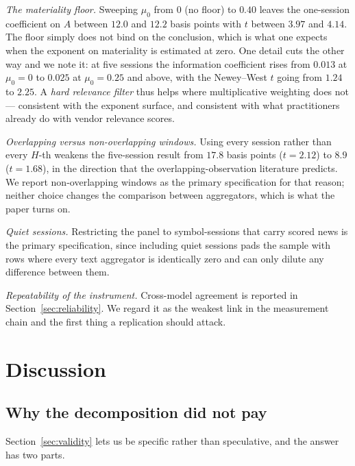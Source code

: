 \emph{The materiality floor.} Sweeping $\mu_0$ from $0$ (no floor) to $0.40$
leaves the one-session coefficient on $A$ between $12.0$ and $12.2$ basis points
with $t$ between $3.97$ and $4.14$. The floor simply does not bind on the
conclusion, which is what one expects when the exponent on materiality is
estimated at zero. One detail cuts the other way and we note it: at five sessions
the information coefficient rises from $0.013$ at $\mu_0=0$ to $0.025$ at
$\mu_0=0.25$ and above, with the Newey--West $t$ going from $1.24$ to $2.25$. A
\emph{hard relevance filter} thus helps where multiplicative weighting does not
--- consistent with the exponent surface, and consistent with what practitioners
already do with vendor relevance scores.

\emph{Overlapping versus non-overlapping windows.} Using every session rather than
every $H$-th weakens the five-session result from $17.8$ basis points ($t=2.12$)
to $8.9$ ($t=1.68$), in the direction that the overlapping-observation literature
predicts. We report non-overlapping windows as the primary specification for that
reason; neither choice changes the comparison between aggregators, which is what
the paper turns on.

\emph{Quiet sessions.} Restricting the panel to symbol-sessions that carry scored
news is the primary specification, since including quiet sessions pads the sample
with rows where every text aggregator is identically zero and can only dilute any
difference between them.

\emph{Repeatability of the instrument.} Cross-model agreement is reported in
Section~\ref{sec:reliability}. We regard it as the weakest link in the measurement
chain and the first thing a replication should attack.

\section{Discussion}\label{sec:discussion}

\subsection{Why the decomposition did not pay}

Section~\ref{sec:validity} lets us be specific rather than speculative, and the
answer has two parts.

